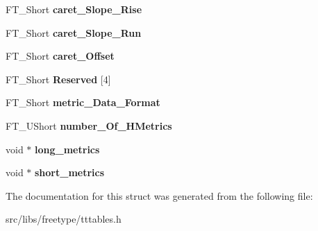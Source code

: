 \begin{DoxyCompactItemize}
\item 
\hypertarget{struct_t_t___hori_header___aeb43d92f56de424d8f28bd389973eca4}{
FT\_\-Short {\bfseries caret\_\-Slope\_\-Rise}}
\label{struct_t_t___hori_header___aeb43d92f56de424d8f28bd389973eca4}

\item 
\hypertarget{struct_t_t___hori_header___acce162ae0554006c11a3383bd3454d69}{
FT\_\-Short {\bfseries caret\_\-Slope\_\-Run}}
\label{struct_t_t___hori_header___acce162ae0554006c11a3383bd3454d69}

\item 
\hypertarget{struct_t_t___hori_header___a791ad767d54cc87e84d9b03d6739f0eb}{
FT\_\-Short {\bfseries caret\_\-Offset}}
\label{struct_t_t___hori_header___a791ad767d54cc87e84d9b03d6739f0eb}

\item 
\hypertarget{struct_t_t___hori_header___af2a2b374d8f81771fb75d3bdc96bcbf7}{
FT\_\-Short {\bfseries Reserved} \mbox{[}4\mbox{]}}
\label{struct_t_t___hori_header___af2a2b374d8f81771fb75d3bdc96bcbf7}

\item 
\hypertarget{struct_t_t___hori_header___a0ed857e9629d2dfb5350a6b5976bf933}{
FT\_\-Short {\bfseries metric\_\-Data\_\-Format}}
\label{struct_t_t___hori_header___a0ed857e9629d2dfb5350a6b5976bf933}

\item 
\hypertarget{struct_t_t___hori_header___aac3ecb9ba7c13436a663b91765e89647}{
FT\_\-UShort {\bfseries number\_\-Of\_\-HMetrics}}
\label{struct_t_t___hori_header___aac3ecb9ba7c13436a663b91765e89647}

\item 
\hypertarget{struct_t_t___hori_header___a3eeb5766b461e9563b659a30e775fcc2}{
void $\ast$ {\bfseries long\_\-metrics}}
\label{struct_t_t___hori_header___a3eeb5766b461e9563b659a30e775fcc2}

\item 
\hypertarget{struct_t_t___hori_header___ae39107c4cfc3e7c1871dbb304bbe4a5a}{
void $\ast$ {\bfseries short\_\-metrics}}
\label{struct_t_t___hori_header___ae39107c4cfc3e7c1871dbb304bbe4a5a}

\end{DoxyCompactItemize}


The documentation for this struct was generated from the following file:\begin{DoxyCompactItemize}
\item 
src/libs/freetype/tttables.h\end{DoxyCompactItemize}

